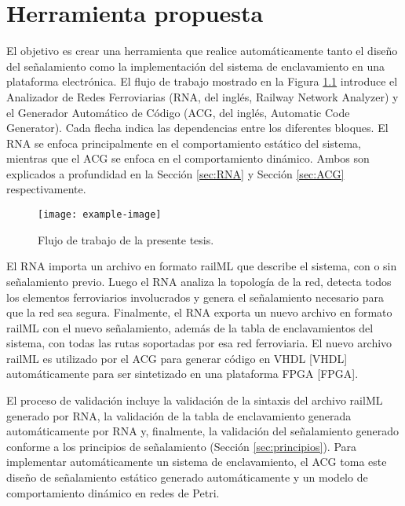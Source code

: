 \chapter{Herramienta propuesta}

    El objetivo es crear una herramienta que realice automáticamente tanto el diseño del señalamiento como la implementación del sistema de enclavamiento en una plataforma electrónica. El flujo de trabajo mostrado en la Figura \ref{fig:workflow} introduce el Analizador de Redes Ferroviarias (RNA, del inglés, Railway Network Analyzer) y el Generador Automático de Código (ACG, del inglés, Automatic Code Generator). Cada flecha indica las dependencias entre los diferentes bloques. El RNA se enfoca principalmente en el comportamiento estático del sistema, mientras que el ACG se enfoca en el comportamiento dinámico. Ambos son explicados a profundidad en la Sección \ref{sec:RNA} y Sección \ref{sec:ACG} respectivamente.

    \begin{figure}[h]
        \centering
        \texttt{[image: example-image]}
        \centering\caption{Flujo de trabajo de la presente tesis.}
        \label{fig:workflow}
    \end{figure}

    El RNA importa un archivo en formato railML que describe el sistema, con o sin señalamiento previo. Luego el RNA analiza la topología de la red, detecta todos los elementos ferroviarios involucrados y genera el señalamiento necesario para que la red sea segura. Finalmente, el RNA exporta un nuevo archivo en formato railML con el nuevo señalamiento, además de la tabla de enclavamientos del sistema, con todas las rutas soportadas por esa red ferroviaria. El nuevo archivo railML es utilizado por el ACG para generar código en VHDL [VHDL] automáticamente para ser sintetizado en una plataforma FPGA [FPGA].
    
    El proceso de validación incluye la validación de la sintaxis del archivo railML generado por RNA, la validación de la tabla de enclavamiento generada automáticamente por RNA y, finalmente, la validación del señalamiento generado conforme a los principios de señalamiento (Sección \ref{sec:principios}). Para implementar automáticamente un sistema de enclavamiento, el ACG toma este diseño de señalamiento estático generado automáticamente y un modelo de comportamiento dinámico en redes de Petri. %
    





